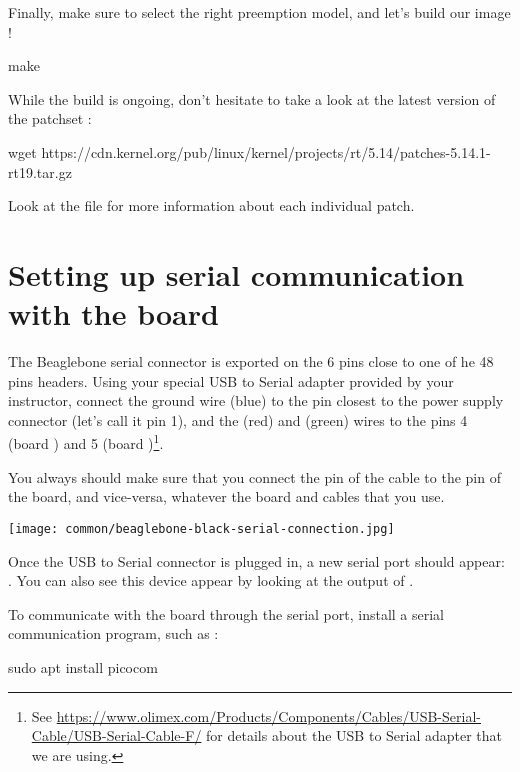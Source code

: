Finally, make sure to select the right preemption model, and let's build our image !

\begin{bashinput}
make
\end{bashinput}

While the build is ongoing, don't hesitate to take a look at the latest
version of the patchset :

\begin{bashinput}
wget https://cdn.kernel.org/pub/linux/kernel/projects/rt/5.14/patches-5.14.1-rt19.tar.gz
\end{bashinput}

Look at the  file for more information about each individual patch.

\section{Setting up serial communication with the board}

The Beaglebone serial connector is exported on the 6 pins close to one
of he 48 pins headers. Using your special USB to Serial adapter provided
by your instructor, connect the ground wire (blue) to the pin closest
to the power supply connector (let's call it pin 1), and the  (red)
and  (green) wires to the pins 4 (board ) and
5 (board )\footnote{See
\url{https://www.olimex.com/Products/Components/Cables/USB-Serial-Cable/USB-Serial-Cable-F/}
for details about the USB to Serial adapter that we are using.}.

You always should make sure that you connect the  pin of the cable
to the  pin of the board, and vice-versa, whatever the board and
cables that you use.

\begin{center}
\texttt{[image: common/beaglebone-black-serial-connection.jpg]}
\end{center}

Once the USB to Serial connector is plugged in, a new serial port
should appear: .  You can also see this device
appear by looking at the output of .

To communicate with the board through the serial port, install a
serial communication program, such as :

\begin{bashinput}
sudo apt install picocom
\end{bashinput}

